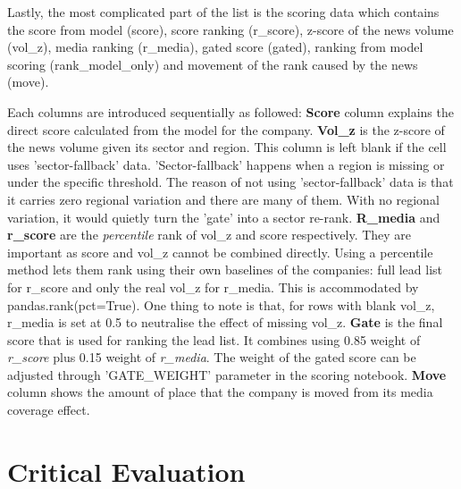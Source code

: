 \documentclass[ %
                    author={Natchalin Iwsakul \\ Inkaphol Siriwongwattana \\ Tanaphan Kummaraphat \\ Patorn Srisupap},
                supervisor={Fernando Moreno-Pino},
                    degree={MSc},
                     title={Propensity Modelling for SME Commercial Lending Using Open Public Data},
                  subtitle={Companies House filings and GDELT media coverage as predictors of first-time borrowing},
                      type={},
                      year={2026}]{dissertation}
\begin{document}
Lastly, the most complicated part of the list is the scoring data which contains the score from model (score), score ranking (r\_score), z-score of the news volume (vol\_z), media ranking (r\_media), gated score (gated), ranking from model scoring (rank\_model\_only) and movement of the rank caused by the news (move).

Each columns are introduced sequentially as followed:
\textbf{Score} column explains the direct score calculated from the model for the company.
\textbf{Vol\_z} is the z-score of the news volume given its sector and region. This column is left blank if the cell uses 'sector-fallback' data. 'Sector-fallback' happens when a region is missing or under the specific threshold. The reason of not using 'sector-fallback' data is that it carries zero regional variation and there are many of them. With no regional variation, it would quietly turn the 'gate' into a sector re-rank.
\textbf{R\_media} and \textbf{r\_score} are the \textit{percentile} rank of vol\_z and score respectively. They are important as score and vol\_z cannot be combined directly. Using a percentile method lets them rank using their own baselines of the companies: full lead list for r\_score and only the real vol\_z for r\_media. This is accommodated by pandas.rank(pct=True). One thing to note is that, for rows with blank vol\_z, r\_media is set at 0.5 to neutralise the effect of missing vol\_z.
\textbf{Gate} is the final score that is used for ranking the lead list. It combines using 0.85 weight of \textit{r\_score} plus 0.15 weight of \textit{r\_media}. The weight of the gated score can be adjusted through 'GATE\_WEIGHT' parameter in the scoring notebook. 
\textbf{Move} column shows the amount of place that the company is moved from its media coverage effect.




\chapter{Critical Evaluation}
\label{chap:evaluation}

\end{document}
